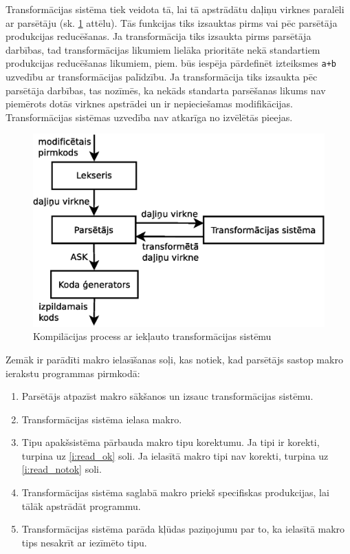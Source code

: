 Transformācijas sistēma tiek veidota tā, lai tā apstrādātu daļiņu virknes paralēli ar parsētāju (sk. \ref{fig:ransform_compiling} attēlu). Tās funkcijas tiks izsauktas pirms vai pēc parsētāja produkcijas reducēšanas. Ja transformācija tiks izsaukta pirms parsētāja darbības, tad transformācijas likumiem lielāka prioritāte nekā standartiem produkcijas reducēšanas likumiem, piem. būs iespēja pārdefinēt izteiksmes \verb|a+b| uzvedību ar transformācijas palīdzību. Ja transformācija tiks izsaukta pēc parsētāja darbības, tas nozīmēs, ka nekāds standarta parsēšanas likums nav piemērots dotās virknes apstrādei un ir nepieciešamas modifikācijas. Transformācijas sistēmas uzvedība nav atkarīga no izvēlētās pieejas.

\begin{figure}[H]
  \centering
    \includegraphics[scale=0.4]{pictures/transform_compiling}
  \caption{\label{fig:ransform_compiling}Kompilācijas process ar iekļauto transformācijas sistēmu}
\end{figure}

Zemāk ir parādīti makro ielasīšanas soļi, kas notiek, kad parsētājs sastop makro ierakstu programmas pirmkodā:
\begin{enumerate}
\item
Parsētājs atpazīst makro sākšanos un izsauc transformācijas sistēmu.
\item
Transformācijas sistēma ielasa makro.
\item
Tipu apakšsistēma pārbauda makro tipu korektumu. Ja tipi ir korekti, turpina uz \ref{i:read_ok} soli. Ja ielasītā makro tipi nav korekti, turpina uz \ref{i:read_notok} soli.
\item \label{i:read_ok}
Transformācijas sistēma saglabā makro priekš specifiskas produkcijas, lai tālāk apstrādāt programmu.
\item \label{i:read_notok}
Transformācijas sistēma parāda kļūdas paziņojumu par to, ka ielasītā makro tips nesakrīt ar iezīmēto tipu.
\end{enumerate}

